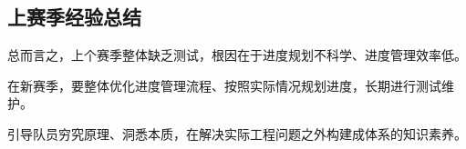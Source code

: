 \subsection{上赛季经验总结}

    总而言之，上个赛季整体缺乏测试，根因在于进度规划不科学、进度管理效率低。\par
    在新赛季，要整体优化进度管理流程、按照实际情况规划进度，长期进行测试维护。\par
    引导队员穷究原理、洞悉本质，在解决实际工程问题之外构建成体系的知识素养。\par